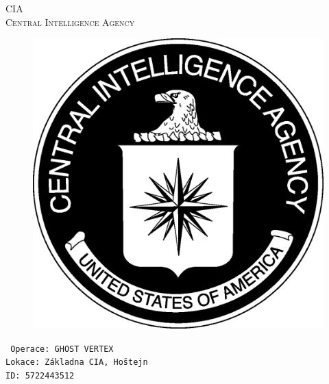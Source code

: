 \documentclass[a4paper, \fontheight]{article}
\begin{document}
	\begin{titlepage}
		\begin{center}		
			\textsc{{\fontsize{80}{0}\selectfont CIA}\\[2em]
				\Huge Central Intelligence Agency\\[2.5em]}
				
			\begin{figure}[H]
				\centering
				\includegraphics[scale=0.6]{sources/CIA_logo.eps}
			\end{figure}
		\end{center}	
		\vfill
		\noindent
		\texttt{\LARGE
				Operace: GHOST VERTEX\\[0.4em]
				Lokace: Základna CIA, Hoštejn\\[0.4em]
				ID: 5722443512}	
\end{titlepage} 
\end{document}

